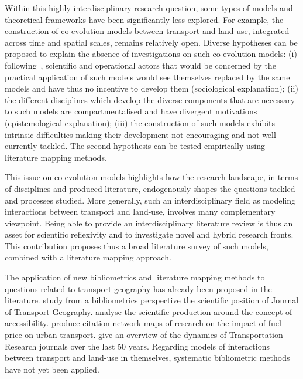 \documentclass[10pt]{article}
\begin{document}
Within this highly interdisciplinary research question, some types of models and theoretical frameworks have been significantly less explored. For example, the construction of co-evolution models between transport and land-use, integrated across time and spatial scales, remains relatively open. Diverse hypotheses can be proposed to explain the absence of investigations on such co-evolution models: (i) following~\cite{commenges:tel-00923682}, scientific and operational actors that would be concerned by the practical application of such models would see themselves replaced by the same models and have thus no incentive to develop them (sociological explanation); (ii) the different disciplines which develop the diverse components that are necessary to such models are compartmentalised and have divergent motivations (epistemological explanation); (iii) the construction of such models exhibits intrinsic difficulties making their development not encouraging and not well currently tackled. The second hypothesis can be tested empirically using literature mapping methods.

This issue on co-evolution models highlights how the research landscape, in terms of disciplines and produced literature, endogenously shapes the questions tackled and processes studied. More generally, such an interdisciplinary field as modeling interactions between transport and land-use, involves many complementary viewpoint. Being able to provide an interdisciplinary literature review is thus an asset for scientific reflexivity and to investigate novel and hybrid research fronts. This contribution proposes thus a broad literature survey of such models, combined with a literature mapping approach.


The application of new bibliometrics and literature mapping methods to questions related to transport geography has already been proposed in the literature. \cite{derudder2019shifting} study from a bibliometrics perspective the scientific position of Journal of Transport Geography. \cite{shi2020literature} analyse the scientific production around the concept of accessibility. \cite{leung2019fuel} produce citation network maps of research on the impact of fuel price on urban transport. \cite{modak2019fifty} give an overview of the dynamics of Transportation Research journals over the last 50 years. Regarding models of interactions between transport and land-use in themselves, systematic bibliometric methods have not yet been applied.
\end{document}
